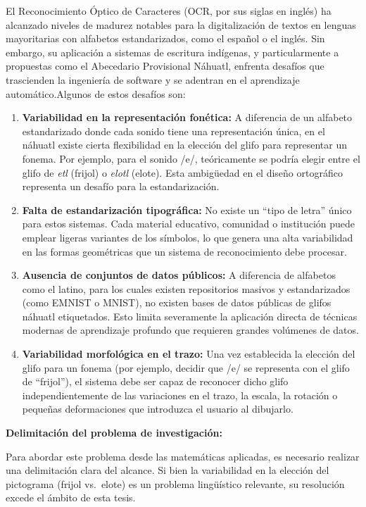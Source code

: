 \documentclass[
  spanish,
  us-letterpaper,
  DIV=11,
  numbers=noendperiod]{scrreprt}
\begin{document}
El Reconocimiento Óptico de Caracteres (OCR, por sus siglas en inglés)
ha alcanzado niveles de madurez notables para la digitalización de
textos en lenguas mayoritarias con alfabetos estandarizados, como el
español o el inglés. Sin embargo, su aplicación a sistemas de escritura
indígenas, y particularmente a propuestas como el Abecedario Provisional
Náhuatl, enfrenta desafíos que trascienden la ingeniería de software y
se adentran en el aprendizaje automático.Algunos de estos desafíos son:

\begin{enumerate}
\def\labelenumi{\arabic{enumi}.}
\item
  \textbf{Variabilidad en la representación fonética:} A diferencia de
  un alfabeto estandarizado donde cada sonido tiene una representación
  única, en el náhuatl existe cierta flexibilidad en la elección del
  glifo para representar un fonema. Por ejemplo, para el sonido /e/,
  teóricamente se podría elegir entre el glifo de \emph{etl} (frijol) o
  \emph{elotl} (elote). Esta ambigüedad en el diseño ortográfico
  representa un desafío para la estandarización.
\item
  \textbf{Falta de estandarización tipográfica:} No existe un ``tipo de
  letra'' único para estos sistemas. Cada material educativo, comunidad
  o institución puede emplear ligeras variantes de los símbolos, lo que
  genera una alta variabilidad en las formas geométricas que un sistema
  de reconocimiento debe procesar.
\item
  \textbf{Ausencia de conjuntos de datos públicos:} A diferencia de
  alfabetos como el latino, para los cuales existen repositorios masivos
  y estandarizados (como EMNIST o MNIST), no existen bases de datos
  públicas de glifos náhuatl etiquetados. Esto limita severamente la
  aplicación directa de técnicas modernas de aprendizaje profundo que
  requieren grandes volúmenes de datos.
\item
  \textbf{Variabilidad morfológica en el trazo:} Una vez establecida la
  elección del glifo para un fonema (por ejemplo, decidir que /e/ se
  representa con el glifo de ``frijol''), el sistema debe ser capaz de
  reconocer dicho glifo independientemente de las variaciones en el
  trazo, la escala, la rotación o pequeñas deformaciones que introduzca
  el usuario al dibujarlo.
\end{enumerate}

\textbf{Delimitación del problema de investigación:}

Para abordar este problema desde las matemáticas aplicadas, es necesario
realizar una delimitación clara del alcance. Si bien la variabilidad en
la elección del pictograma (frijol vs.~elote) es un problema lingüístico
relevante, su resolución excede el ámbito de esta tesis.
\end{document}
